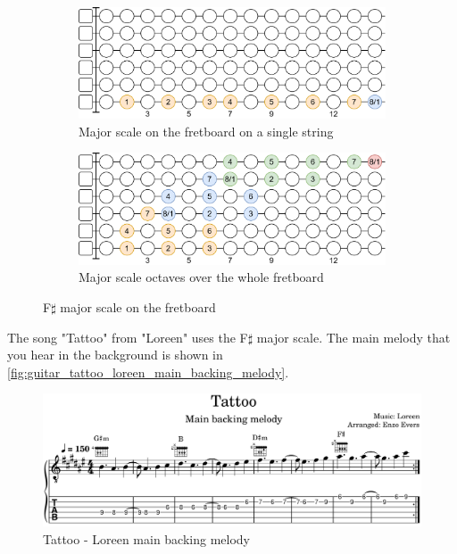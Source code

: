 \begin{figure}[h]
	\vspace{0.5cm}
	
	\begin{subfigure}[b]{\textwidth}
		\centering
		\includegraphics[height=0.18\textheight]{../../Images/guitar_major_scale_single_string.png}
		\caption{Major scale on the fretboard on a single string}
		\label{fig:guitar_major_scale_fretboard_single_string}
	\end{subfigure}
	
	\vspace{0.5cm}
	
	\begin{subfigure}[b]{\textwidth}
		\centering
		\includegraphics[height=0.18\textheight]{../../Images/guitar_major_scale_octaves_over_fretboard.png}
		\caption{Major scale octaves over the whole fretboard}
		\label{fig:guitar_major_scale_octaves_over_fretboard}
	\end{subfigure}
	
	\caption{F$\sharp$ major scale on the fretboard}
	\label{fig:guitar_major_scale_fretboard}
\end{figure}

\clearpage

The song "Tattoo" from "Loreen" uses the F$\sharp$ major scale. The main melody that you hear in the background is shown in \autoref{fig:guitar_tattoo_loreen_main_backing_melody}.

\begin{figure}[h]
	\centering
	\includegraphics[width=\textwidth]{../../MuseScore/Guitar/LoreenTattooSimpleBackingMelody.png}
	\caption{Tattoo - Loreen main backing melody}
	\label{fig:guitar_tattoo_loreen_main_backing_melody}
\end{figure}

